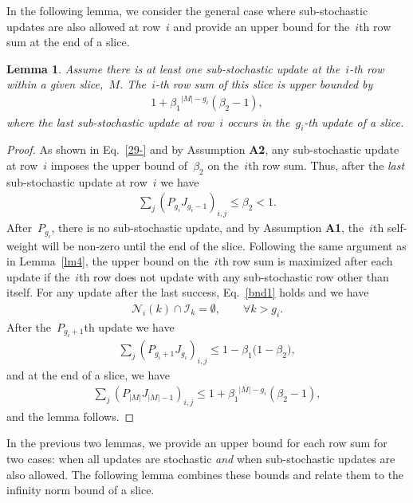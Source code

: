 \documentclass[draftclsnofoot, onecolumn, 12pt]{IEEEtran}
\newtheorem{lem}{Lemma}
\def\mc{\mathcal}
\begin{document}
In the following lemma, we consider the general case where sub-stochastic updates are also allowed at row~$i$ and provide an upper bound for the~$i$th row sum at the end of a slice.
\begin{lem}\label{lm5}
Assume there is at least one sub-stochastic update at the~$i$-th row within a given slice,~$M$. The~$i$-th row sum of this slice is upper bounded by
\begin{eqnarray}
1+{\beta_1}^{\vert {M}\vert - {g}_{i}}({\beta}_2 -1),
\end{eqnarray}
where the last sub-stochastic update at row~$i$ occurs in the~${g}_{i}$-th update of a slice.
\end{lem}
\begin{proof}
As shown in Eq.~\eqref{29-} and by Assumption {\bf A2}, any sub-stochastic update at row~$i$ imposes the upper bound of~$\beta_2$ on the~$i$th row sum.
Thus, after the \textit{last} sub-stochastic update at row~$i$ we have
\begin{eqnarray*}
\sum_{j}(P_{{g}_{i}} J_{{g}_{i}-1})_{i,j}\leq \beta_2 < 1.
\end{eqnarray*}
After~$P_{{g}_{i}}$, there is no sub-stochastic update, and by Assumption {\bf{A1}}, the~$i$th self-weight will be non-zero until the end of the slice. Following the same argument as in Lemma~\ref{lm4}, the upper bound on the~$i$th row sum is maximized after each update if the~$i$th row does not update with any  sub-stochastic row other than itself. For any update after the last success, Eq.~\eqref{bnd1} holds and we have
\begin{eqnarray}
{\mc{N}_{i}(k)}\cap\mathcal{I}_k = \emptyset,\qquad \forall k > {g}_{i}.
\end{eqnarray} 
After the~$P_{{g}_{i}+1}$th update we have
\begin{eqnarray}\label{34}
\sum_{j}(P_{{g}_{i}+1} J_{{g}_{i}})_{i,j}\leq 1 - \beta_1 \Bigg(1-{\beta}_2\Bigg),
\end{eqnarray}
and at the end of a slice, we have
\begin{eqnarray}\label{35}
\sum_{j}({P}_{\vert {M}\vert} J_{\vert {M}\vert -1 })_{i,j} \leq 1+{\beta_1}^{\vert {M}\vert - {g}_{i}}({\beta}_2 -1),
\end{eqnarray}
and the lemma follows.
\end{proof}

In the previous two lemmas, we provide an upper bound for each row sum for two cases: when all updates are stochastic \emph{and} when sub-stochastic updates are also allowed. The following lemma combines these bounds and relate them to the infinity norm bound of a slice.
\end{document}
